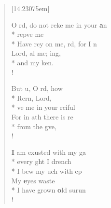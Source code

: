 \begin{flushleft}
\begin{verse}[14.23075em]

 O rd, do not reke me in your \textbf{a}n\flagflex{\dag}\\*
repve me    \\*
 Have rcy on me, rd, for I n\\
Lord, al me;    ing,\\*
 and my    ken.\\!

But u, O rd, how \flagflex{\dag}\\*
 Rern, Lord,   \\*
ve me in your rciful \\
 For in ath there is  re  \\*
from the gve,     \\!

 \textbf{I} am exusted with my ga\flagflex{\dag}\\*
every ght I drench    \\*
I bew my uch with ep\\
 My \textbf{e}yes waste   \\*
I have grown \textbf{o}ld surun    \\!


\end{verse}
\end{flushleft}
